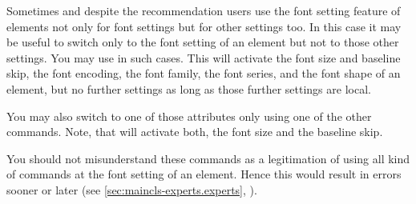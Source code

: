 \begin{Declaration}
\end{Declaration}
Sometimes and despite the recommendation
users use the font setting feature of elements not only for font settings but
for other settings too. In this case it may be useful to switch only to the
font setting of an element but not to those other settings. You may use
 in such cases. This will activate the font size and
baseline skip, the font encoding, the font family, the font series, and the
font shape of an element, but no further settings as long as those further
settings are local.

You may also switch to one of those attributes only using one of the other
commands. Note, that  will activate both, the font
size and the baseline skip.

You should not misunderstand these commands as a legitimation of using all
kind of commands at the font setting of an element. Hence this would result
in errors sooner or later (see \autoref{sec:maincls-experts.experts},
).%
\EndIndexGroup
%
\EndIndexGroup


